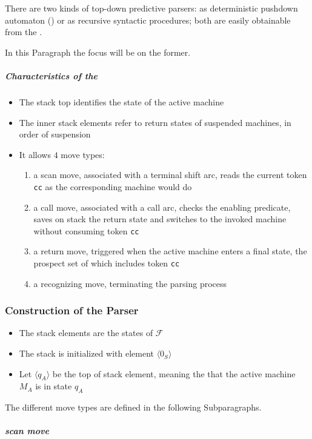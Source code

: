 \documentclass[english]{article}
\begin{document}
There are two kinds of top-down predictive parsers:
as deterministic pushdown automaton (\DPDA) or as recursive syntactic procedures;
both are easily obtainable from the \PCFG.

In this Paragraph the focus will be on the former.

\subparagraph*{Characteristics of the \DPDA}
\begin{itemize}
  \item The stack top identifies the state of the active machine
  \item The inner stack elements refer to return states of suspended machines, in order of suspension
  \item It allows \(4\) move types:
        \begin{enumerate}
          \item a scan move, associated with a terminal shift arc, reads the current token \texttt{cc} as the corresponding machine would do
          \item a call move, associated with a call arc, checks the enabling predicate, saves on stack the return state and switches to the invoked machine without consuming token \texttt{cc}
          \item a return move, triggered when the active machine enters a final state, the prospect set of which includes token \texttt{cc}
          \item a recognizing move, terminating the parsing process
        \end{enumerate}
\end{itemize}

\subsubsection[Construction of the ELL(1) Parser]{Construction of the \ello Parser}

\begin{itemize}
  \item The stack elements are the states of \PCFG \(\mathcal{F}\)
  \item The stack is initialized with element \(\langle 0_S \rangle\)
  \item Let \(\langle q_A \rangle\) be the top of stack element, meaning the that the active machine \(M_A\) is in state \(q_A\)
\end{itemize}

The different move types are defined in the following Subparagraphs.

\subparagraph*{scan move}
\end{document}
